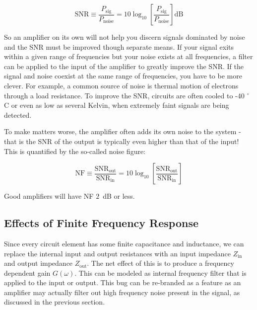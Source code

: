\documentclass{tufte-book}
\begin{document}
\begin{equation}
\label{eq:def_snr}
\text{SNR} \equiv \frac{P_\text{sig}}{P_\text{noise}} = 10\log_{10}\left[\frac{P_\text{sig}}{P_\text{noise}}\right] \text{dB}
\end{equation}

So an amplifier on its own will not help you discern signals dominated by noise and the SNR must be improved though separate means. If your signal exits within a given range of frequencies but your noise exists at all frequencies, a filter can be applied to the input of the amplifier to greatly improve the SNR. If the  signal and noise coexist at the same range of frequencies, you have to be more clever. For example, a common source of noise is thermal motion of electrons through a load resistance. To improve the SNR, circuits are often cooled to -40 $^\circ$C or even as low as several Kelvin, when extremely faint signals are being detected.

To make matters worse, the amplifier often adds its own noise to the system - that is the SNR of the output is typically even higher than that of the input! This is quantified by the so-called noise figure:

\begin{equation}
\label{eq:def_noise_figure}
\text{NF} \equiv \frac{\text{SNR}_\text{out}}{\text{SNR}_\text{in}} = 10\log_{10}\left[\frac{\text{SNR}_\text{out}}{\text{SNR}_\text{in}}\right]
\end{equation}

\noindent Good amplifiers will have NF $2$~dB or less.

\subsection{Effects of Finite Frequency Response}
Since every circuit element has some finite capacitance and inductance, we can replace the internal input and output resistances with an input impedance $Z_\text{in}$ and output impedance $Z_\text{out}$. The net effect of this is to produce a frequency dependent gain $G(\omega)$. This can be modeled as internal frequency filter that is applied to the input or output. This bug can be re-branded as a feature as an amplifier may actually filter out high frequency noise present in the signal, as discussed in the previous section.
\end{document}
